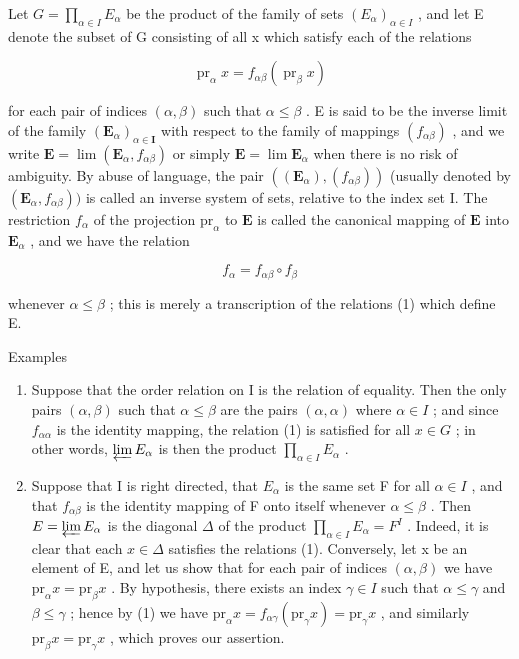 Let \(G = \prod_{\alpha \in I} E_{\alpha}\) be the product of the family of sets \((E_{\alpha})_{\alpha \in I}\) , and let E denote the subset of G consisting of all x which satisfy each of the relations

\[
\operatorname{pr} _ {\alpha} x = f _ {\alpha \beta} (\operatorname{pr} _ {\beta} x)\tag{1}
\]

for each pair of indices \((\alpha, \beta)\) such that \(\alpha \leqslant \beta\) . E is said to be the inverse limit of the family \((\mathbf{E}_{\alpha})_{\alpha \in \mathbf{I}}\) with respect to the family of mappings \((f_{\alpha \beta})\) , and we write \(\mathbf{E} = \lim (\mathbf{E}_{\alpha}, f_{\alpha \beta})\) or simply \(\mathbf{E} = \lim \mathbf{E}_{\alpha}\) when there is no risk of ambiguity. By abuse of language, the pair \(((\mathbf{E}_{\alpha}), (f_{\alpha \beta}))\) (usually denoted by \((\mathbf{E}_{\alpha}, f_{\alpha \beta}))\) is called an inverse system of sets, relative to the index set I. The restriction \(f_{\alpha}\) of the projection \(\mathrm{pr}_{\alpha}\) to \(\mathbf{E}\) is called the canonical mapping of \(\mathbf{E}\) into \(\mathbf{E}_{\alpha}\) , and we have the relation

\[
f _ {\alpha} = f _ {\alpha \beta} \circ f _ {\beta}\tag{2}
\]

whenever \(\alpha \leqslant \beta\) ; this is merely a transcription of the relations (1) which define E.

Examples

\begin{enumerate}
\def\labelenumi{(\arabic{enumi})}
\item
  Suppose that the order relation on I is the relation of equality. Then the only pairs \((\alpha, \beta)\) such that \(\alpha \leqslant \beta\) are the pairs \((\alpha, \alpha)\) where \(\alpha \in I\) ; and since \(f_{\alpha \alpha}\) is the identity mapping, the relation (1) is satisfied for all \(x \in G\) ; in other words, \(\varprojlim E_{\alpha}\) is then the product \(\prod_{\alpha \in I} E_{\alpha}\) .
\item
  Suppose that I is right directed, that \(E_{\alpha}\) is the same set F for all \(\alpha \in I\) , and that \(f_{\alpha\beta}\) is the identity mapping of F onto itself whenever \(\alpha \leqslant \beta\) . Then \(E = \varprojlim E_{\alpha}\) is the diagonal \(\Delta\) of the product \(\prod_{\alpha \in I} E_{\alpha} = F^{I}\) . Indeed, it is clear that each \(x \in \Delta\) satisfies the relations (1). Conversely, let x be an element of E, and let us show that for each pair of indices \((\alpha, \beta)\) we have \(\mathrm{pr}_{\alpha}x = \mathrm{pr}_{\beta}x\) . By hypothesis, there exists an index \(\gamma \in I\) such that \(\alpha \leqslant \gamma\) and \(\beta \leqslant \gamma\) ; hence by (1) we have \(\mathrm{pr}_{\alpha}x = f_{\alpha \gamma}(\mathrm{pr}_{\gamma}x) = \mathrm{pr}_{\gamma}x\) , and similarly \(\mathrm{pr}_{\beta}x = \mathrm{pr}_{\gamma}x\) , which proves our assertion.
\end{enumerate}


